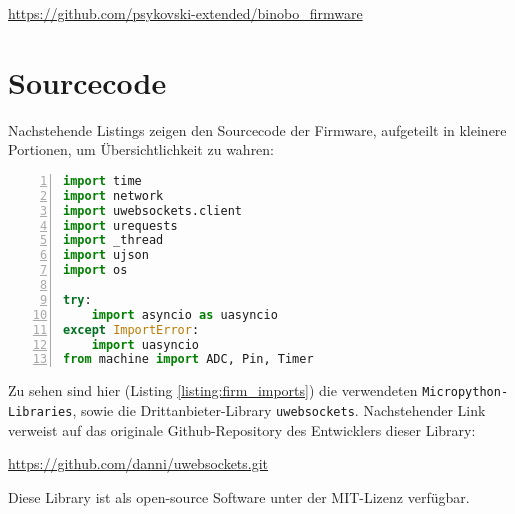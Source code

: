 \documentclass[paper=a4,12pt]{scrreprt}
\begin{document}
\url{https://github.com/psykovski-extended/binobo_firmware}

\section{Sourcecode}

Nachstehende Listings zeigen den Sourcecode der Firmware, aufgeteilt in kleinere Portionen, um Übersichtlichkeit zu wahren:\newline
\begin{lstlisting}[caption={Firmware: Imports}, captionpos=b, label={listing:firm_imports}, language=python, morekeywords={async, await, as}, numbers=left,
  stepnumber=1]
import time
import network
import uwebsockets.client
import urequests
import _thread
import ujson
import os

try:
    import asyncio as uasyncio
except ImportError:
    import uasyncio
from machine import ADC, Pin, Timer
\end{lstlisting}

Zu sehen sind hier (Listing \ref{listing:firm_imports}) die verwendeten \texttt{Micropython-Libraries}, sowie die Drittanbieter-Library \texttt{uwebsockets}\cite{uwebsocket}. Nachstehender Link verweist auf das originale Github-Repository des Entwicklers dieser
Library:\newline

\url{https://github.com/danni/uwebsockets.git}\newline

Diese Library ist als open-source Software unter der MIT-Lizenz verfügbar.\newline
\end{document}
